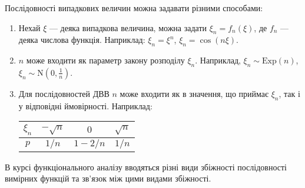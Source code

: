 Послідовності випадкових величин можна задавати різними способами:
\begin{enumerate}
    \item Нехай $\xi$ --- деяка випадкова величина, можна задати $\xi_n = f_n(\xi)$, де $f_n$ --- деяка числова функція. 
    Наприклад: $\xi_n = \xi^n$, $\xi_n = \cos (n\xi)$.
    \item $n$ може входити як параметр закону розподілу $\xi_n$. Наприклад, $\xi_n \sim \mathrm{Exp}(n)$, $\xi_n \sim \mathrm{N}(0, \frac{1}{n})$.
    \item Для послідовностей ДВВ $n$ може входити як в значення, що приймає $\xi_n$, так і у відповідні ймовірності. Наприклад:
    \begin{tabular}{|c|c|c|c|}
        \hline
        $\xi_n$ & $-\sqrt{n}$ & $0$ & $\sqrt{n}$ \\
        \hline
        $p$ & $1/n$ & $1 - 2/n$ & $1/n$ \\
        \hline
    \end{tabular}
\end{enumerate}
В курсі функціонального аналізу вводяться різні види збіжності послідовності вимірних функцій та
зв'язок між цими видами збіжності.

